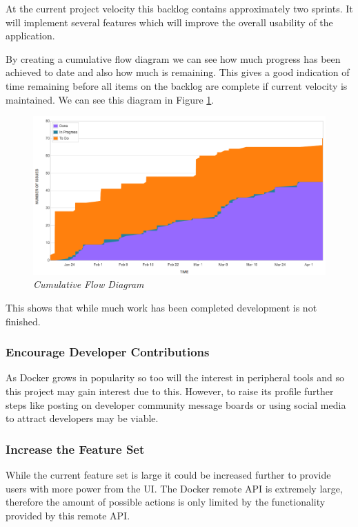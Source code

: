 At the current project velocity this backlog contains approximately two sprints. It will implement several features which will improve the overall usability of the application. 

By creating a cumulative flow diagram we can see how much progress has been achieved to date and also how much is remaining. This gives a good indication of time remaining before all items on the backlog are complete if current velocity is maintained. We can see this diagram in Figure \ref{fig:cumulative_flow}.

\clearpage

\begin{figure}[!ht]
	\centering
	\includegraphics*[width=\textwidth]{images/cumulative_flow}
	\caption{\em Cumulative Flow Diagram}
	\label{fig:cumulative_flow}
\end{figure}

This shows that while much work has been completed development is not finished.

\subsubsection{Encourage Developer Contributions}
As Docker grows in popularity so too will the interest in peripheral tools and so this project may gain interest due to this. However, to raise its profile further steps like posting on developer community message boards or using social media to attract developers may be viable.

\subsubsection{Increase the Feature Set}
While the current feature set is large it could be increased further to provide users with more power from the UI. The Docker remote API is extremely large, therefore the amount of possible actions is only limited by the functionality provided by this remote API.

